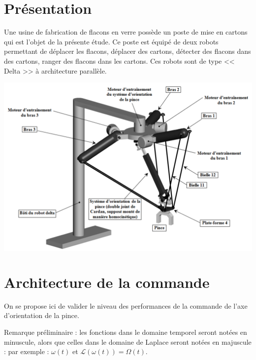 \documentclass[10pt,fleqn]{article} %
\begin{document}

\vspace{4cm}
\pagestyle{fancy}
\thispagestyle{plain}

\def\columnseprulecolor{\color{ocre}}
\setlength{\columnseprule}{0.4pt} 

\def\pathfig{images}

\begin{multicols}{2}
\section*{Présentation}
Une usine de fabrication de flacons en verre possède un poste de mise en cartons qui est l'objet de la présente étude. Ce poste est équipé de deux robots permettant de déplacer les flacons, déplacer des cartons, détecter des flacons dans des cartons, ranger des flacons dans les cartons.
Ces robots sont de type << Delta >> à architecture parallèle. 

\begin{center}
\includegraphics[width=\linewidth]{images/fig_01}
\end{center}

\section*{Architecture de la commande}
On se propose ici de valider le niveau des performances de la commande de l’axe d’orientation de la pince.

Remarque préliminaire : les fonctions dans le domaine temporel seront notées en minuscule, alors que celles dans le domaine de Laplace seront notées en majuscule : par exemple : $\omega(t)$ et $\mathcal{L}(\omega(t))=\Omega(t)$.


\end{multicols}
\end{document}
